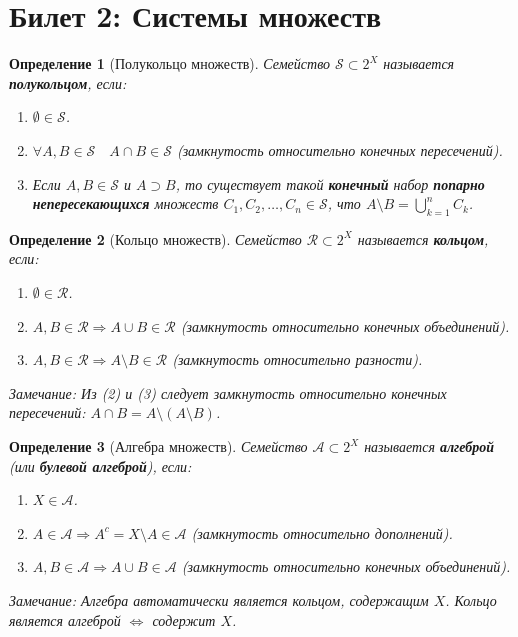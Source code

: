 \documentclass[a4paper, 12pt]{article}
\newtheorem{definition}{Определение}
\newcommand{\1}{\mathbf{1}}
\begin{document}
\section*{Билет 2: Системы множеств}
\begin{definition}[Полукольцо множеств]
    Семейство $\mathcal{S} \subset 2^X$ называется \textbf{полукольцом}, если:
    \begin{enumerate}[label=(\arabic*)]
        \item $\emptyset \in \mathcal{S}$.
        \item $\forall A, B \in \mathcal{S} \quad A \cap B \in \mathcal{S}$ (замкнутость относительно конечных пересечений).
        \item Если $A, B \in \mathcal{S}$ и $A \supset B$, то существует такой \textbf{конечный} набор \textbf{попарно непересекающихся} множеств $C_1, C_2, \dots, C_n \in \mathcal{S}$, что $A \setminus B = \bigcup_{k=1}^n C_k$.
    \end{enumerate}
\end{definition}

\begin{definition}[Кольцо множеств]
    Семейство $\mathcal{R} \subset 2^X$ называется \textbf{кольцом}, если:
    \begin{enumerate}[label=(\arabic*)]
        \item $\emptyset \in \mathcal{R}$.
        \item $A, B \in \mathcal{R} \Rightarrow A \cup B \in \mathcal{R}$ (замкнутость относительно конечных объединений).
        \item $A, B \in \mathcal{R} \Rightarrow A \setminus B \in \mathcal{R}$ (замкнутость относительно разности).
    \end{enumerate}
    \textit{Замечание:} Из (2) и (3) следует замкнутость относительно конечных пересечений: $A \cap B = A \setminus (A \setminus B)$.
\end{definition}

\begin{definition}[Алгебра множеств]
    Семейство $\mathcal{A} \subset 2^X$ называется \textbf{алгеброй} (или \textbf{булевой алгеброй}), если:
    \begin{enumerate}[label=(\arabic*)]
        \item $X \in \mathcal{A}$.
        \item $A \in \mathcal{A} \Rightarrow A^c = X \setminus A \in \mathcal{A}$ (замкнутость относительно дополнений).
        \item $A, B \in \mathcal{A} \Rightarrow A \cup B \in \mathcal{A}$ (замкнутость относительно конечных объединений).
    \end{enumerate}
    \textit{Замечание:} Алгебра автоматически является кольцом, содержащим $X$. Кольцо является алгеброй $\Leftrightarrow$ содержит $X$.
\end{definition}
\end{document}
